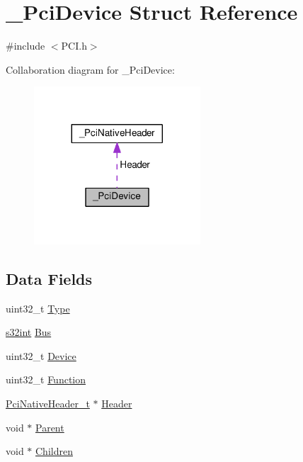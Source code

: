 \hypertarget{struct__PciDevice}{}\section{\+\_\+\+Pci\+Device Struct Reference}
\label{struct__PciDevice}


{\ttfamily \#include $<$P\+C\+I.\+h$>$}



Collaboration diagram for \+\_\+\+Pci\+Device\+:
\nopagebreak
\begin{figure}[H]
\begin{center}
\leavevmode
\includegraphics[width=176pt]{struct__PciDevice__coll__graph}
\end{center}
\end{figure}
\subsection*{Data Fields}
\begin{DoxyCompactItemize}
\item 
uint32\+\_\+t \hyperlink{struct__PciDevice_a57d861d58ee386f1fe1d8820c1e409c5}{Type}
\item 
\hyperlink{common_8h_a61350201bbcea1180bb1160bd09b717f}{s32int} \hyperlink{struct__PciDevice_ac99e17b6dde217c76aeec72883f4d1e7}{Bus}
\item 
uint32\+\_\+t \hyperlink{struct__PciDevice_abab1111099256cd120062a3c01d56f75}{Device}
\item 
uint32\+\_\+t \hyperlink{struct__PciDevice_ac8b9939eac2f6edaf3372d22871554e7}{Function}
\item 
\hyperlink{PCI_8h_a478d1e5507b733431433bfe46bc1d465}{Pci\+Native\+Header\+\_\+t} $\ast$ \hyperlink{struct__PciDevice_a308d9d7234decbd3802735bf0a83e156}{Header}
\item 
void $\ast$ \hyperlink{struct__PciDevice_ac46c4ff9140c0d3c4609f3cf53cea0e6}{Parent}
\item 
void $\ast$ \hyperlink{struct__PciDevice_adf56e308e389296a7a4612b048d906f7}{Children}
\end{DoxyCompactItemize}


